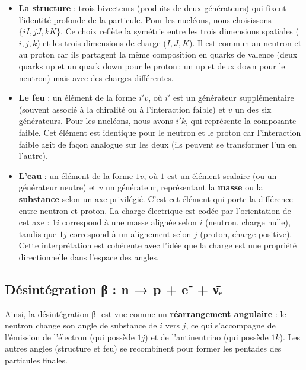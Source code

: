 \documentclass[11pt]{article}
\providecommand{\tightlist}{%
\setlength{\itemsep}{2pt}\setlength{\parskip}{6pt}
}
\begin{document}
\begin{itemize}
\tightlist
\item
  \textbf{La structure} : trois bivecteurs (produits de deux
  générateurs) qui fixent l'identité profonde de la particule. Pour les
  nucléons, nous choisissons \(\{iI, jJ, kK\}\). Ce choix reflète la
  symétrie entre les trois dimensions spatiales (\(i,j,k\)) et les trois
  dimensions de charge (\(I,J,K\)). Il est commun au neutron et au
  proton car ils partagent la même composition en quarks de valence
  (deux quarks up et un quark down pour le proton\,; un up et deux down
  pour le neutron) mais avec des charges différentes.
\item
  \textbf{Le feu} : un élément de la forme \(i'v\), où \(i'\) est un
  générateur supplémentaire (souvent associé à la chiralité ou à
  l'interaction faible) et \(v\) un des six générateurs. Pour les
  nucléons, nous avons \(i'k\), qui représente la composante faible. Cet
  élément est identique pour le neutron et le proton car l'interaction
  faible agit de façon analogue sur les deux (ils peuvent se transformer
  l'un en l'autre).
\item
  \textbf{L'eau} : un élément de la forme \(1v\), où \(1\) est un
  élément scalaire (ou un générateur neutre) et \(v\) un générateur,
  représentant la \textbf{masse} ou la \textbf{substance} selon un axe
  privilégié. C'est cet élément qui porte la différence entre neutron et
  proton. La charge électrique est codée par l'orientation de cet axe :
  \(1i\) correspond à une masse alignée selon \(i\) (neutron, charge
  nulle), tandis que \(1j\) correspond à un alignement selon \(j\)
  (proton, charge positive). Cette interprétation est cohérente avec
  l'idée que la charge est une propriété directionnelle dans l'espace
  des angles.
\end{itemize}

\hypertarget{duxe9sintuxe9gration-ux3b2-n-p-e-ux3bdux2091}{%
\subsection{Désintégration β : n → p + e⁻ +
ν̄ₑ}\label{duxe9sintuxe9gration-ux3b2-n-p-e-ux3bdux2091}}

Ainsi, la désintégration β⁻ est vue comme un \textbf{réarrangement
angulaire} : le neutron change son angle de substance de \(i\) vers
\(j\), ce qui s'accompagne de l'émission de l'électron (qui possède
\(1j\)) et de l'antineutrino (qui possède \(1k\)). Les autres angles
(structure et feu) se recombinent pour former les pentades des
particules finales.
\end{document}
